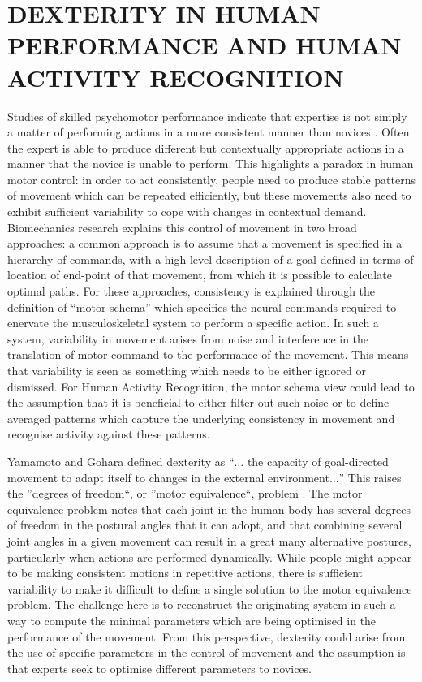 \documentclass{sigchi}
\begin{document}
\section{DEXTERITY IN HUMAN PERFORMANCE AND HUMAN ACTIVITY RECOGNITION}
Studies of skilled psychomotor performance indicate that expertise is not simply a matter of performing actions 
in a more consistent manner than novices \cite{Kelso2014}. Often the expert is able to produce different but 
contextually appropriate actions in a manner that the novice is unable to perform. This highlights a paradox 
in human motor control: in order to act consistently, people need to produce stable patterns of movement 
which can be repeated efficiently, but these movements also need to exhibit sufficient variability to cope 
with changes in contextual demand. 
Biomechanics research explains this control of movement in two broad approaches: 
a common approach is to assume that a movement is specified in a hierarchy of commands, 
with a high-level description of a goal defined in terms of location of end-point of that movement, 
from which it is possible to calculate optimal paths. 
For these approaches, consistency is 
explained through the definition of ``motor schema'' which specifies the neural commands required to enervate 
the musculoskeletal system to perform a specific action. In such a system, variability in movement arises 
from noise and interference in the translation of motor command to the performance of the movement. 
This means that variability is seen as something which needs to be either ignored or dismissed. 
For Human Activity Recognition, the motor schema view could lead to the assumption that it is beneficial 
to either filter out such noise or to define averaged patterns which capture the underlying consistency 
in movement and recognise activity against these patterns. 

Yamamoto and Gohara \cite{Yamamoto2000} defined dexterity as ``$\ldots$ the capacity of goal-directed movement 
to adapt itself to changes in the external environment$\ldots$''  
This raises the ''degrees of freedom``, or ''motor equivalence``, 
problem \cite{Bernstein1967}. 
The motor equivalence problem notes that each joint in the human body has several degrees of freedom in 
the postural angles that it can adopt, and that combining several joint angles in a given movement can 
result in a great many alternative postures, particularly when actions are performed dynamically. 
While people might appear to be making consistent motions in repetitive actions, there is sufficient 
variability to make it difficult to define a single solution to the motor equivalence problem. 
The challenge here is to reconstruct the originating system in such a way to 
compute the minimal parameters which are being optimised in the performance of the movement. 
From this perspective, dexterity could arise from the use of specific parameters in the control of movement and 
the assumption is that experts seek to optimise different parameters to novices. 
 
\end{document}
